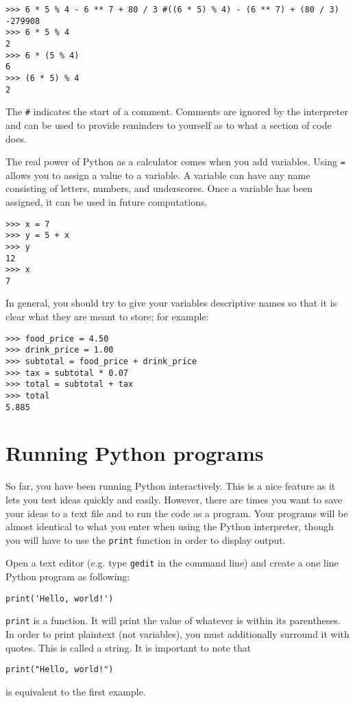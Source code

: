 \documentclass[11pt]{cselabheader}
\begin{document}
\begin{lstlisting}[style=bash]
>>> 6 * 5 % 4 - 6 ** 7 + 80 / 3 #((6 * 5) % 4) - (6 ** 7) + (80 / 3)
-279908
>>> 6 * 5 % 4
2
>>> 6 * (5 % 4)
6
>>> (6 * 5) % 4
2
\end{lstlisting}

The \texttt{\#} indicates the start of a comment. Comments are ignored by the
interpreter and can be used to provide reminders to yourself as to what a
section of code does.

The real power of Python as a calculator comes when you add variables. Using
\texttt{=} allows you to assign a value to a variable. A variable can have any
name consisting of letters, numbers, and underscores. Once a variable has been
assigned, it can be used in future computations.

\begin{lstlisting}[style=bash]
>>> x = 7
>>> y = 5 + x
>>> y
12
>>> x
7
\end{lstlisting}

In general, you should try to give your variables descriptive names so that it is
clear what they are meant to store; for example:

\begin{lstlisting}[style=bash]
>>> food_price = 4.50
>>> drink_price = 1.00
>>> subtotal = food_price + drink_price
>>> tax = subtotal * 0.07
>>> total = subtotal + tax
>>> total
5.885
\end{lstlisting}

\pagebreak
\section{Running Python programs} 

So far, you have been running Python interactively. This is a nice feature as it
lets you test ideas quickly and easily. However, there are times you want to
save your ideas to a text file and to run the code as a program. Your programs
will be almost identical to what you enter when using the Python interpreter,
though you will have to use the \texttt{print} function in order to display
output.

Open a text editor (e.g. type \texttt{gedit} in the command line) and create a
one line Python program as following:
\begin{lstlisting}[style=python]
print('Hello, world!')
\end{lstlisting}

\texttt{print} is a function. It will print the value of whatever is within its
parentheses. In order to print plaintext (not variables), you must additionally
surround it with quotes. This is called a string. It is important to note that
\begin{lstlisting}[style=python]
print("Hello, world!")
\end{lstlisting}
is equivalent to the first example.
\end{document}
